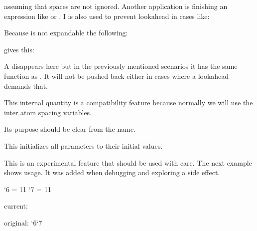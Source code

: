 assuming that spaces are not ignored. Another application is finishing
an expression like  or . I is also used
to prevent lookahead in cases like:

\starttyping
\vrule height 3pt depth 2pt width 5pt\relax
{}\relax
\stoptyping

Because  is not expandable the following:

\startbuffer
\edef\foo{\relax}   \meaningfull\foo
\edef\oof{\norelax} \meaningfull\oof
\stopbuffer

\typebuffer

gives this:

\startlines
\getbuffer
\stoplines

A  disappears here but in the previously mentioned scenarios
it has the same function as . It will not be pushed back either
in cases where a lookahead demands that.

\stopoldprimitive

\startoldprimitive[title={\prm {relpenalty}}]

This internal quantity is a compatibility feature because normally we will use
the inter atom spacing variables.

\stopoldprimitive

\startnewprimitive[title={\prm {resetlocalboxes}}]

Its purpose should be clear from the name.

\stopnewprimitive

\startnewprimitive[title={\prm {resetmathspacing}}]

This initializes all parameters to their initial values.

\stopnewprimitive

\startnewprimitive[title={\prm {restorecatcodetable}}]

This is an experimental feature that should be used with care. The next example
shows usage. It was added when debugging and exploring a side effect.

\starttyping
{}

\bgroup

    \catcode`6 = 11 \catcode`7 = 11

    \bgroup


    current: \the\catcodetable

    original: \the\catcode`6\quad \the\catcode`7


